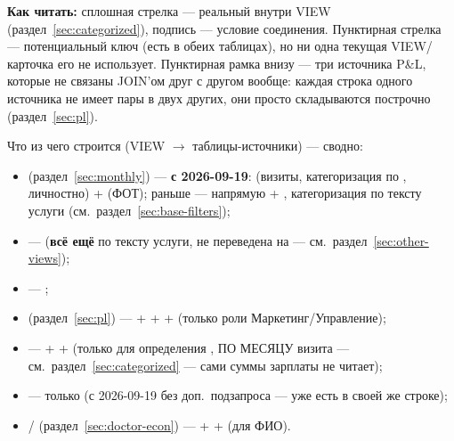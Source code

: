 \documentclass[11pt,a4paper]{article}
\begin{document}
\textbf{Как читать:} сплошная стрелка --- реальный \texttt{} внутри
VIEW (раздел~\ref{sec:categorized}), подпись --- условие соединения.
Пунктирная стрелка --- потенциальный ключ (есть в обеих таблицах), но
ни одна текущая VIEW/карточка его не использует. Пунктирная рамка внизу
--- три источника P\&L, которые не связаны JOIN'ом друг с другом вообще:
каждая строка одного источника не имеет пары в двух других, они просто
складываются построчно (раздел~\ref{sec:pl}).

Что из чего строится (VIEW $\to$ таблицы-источники) --- сводно:

\begin{itemize}[leftmargin=*]
\item \texttt{} (раздел~\ref{sec:monthly}) ---
  \textbf{с 2026-09-19}: \texttt{} (визиты, категоризация
  по \texttt{}, личностно) + \texttt{} (ФОТ); раньше ---
  \texttt{} напрямую + \texttt{}, категоризация
  по тексту услуги (см.\ раздел~\ref{sec:base-filters});
\item \texttt{} --- \texttt{}
  (\textbf{всё ещё} по тексту услуги, не переведена на
  \texttt{} --- см.\ раздел~\ref{sec:other-views});
\item \texttt{} --- \texttt{};
\item \texttt{} (раздел~\ref{sec:pl}) ---
  \texttt{} + \texttt{} + \texttt{} +
  \texttt{} (только роли Маркетинг/Управление);
\item \texttt{} --- \texttt{} +
  \texttt{} + \texttt{} (только для определения
  \texttt{}, ПО МЕСЯЦУ визита --- см.\ раздел~\ref{sec:categorized} ---
  сами суммы зарплаты не читает);
\item \texttt{} --- только \texttt{} (с
  2026-09-19 без доп.\ подзапроса --- \texttt{} уже есть в своей же
  строке);
\item \texttt{} / \texttt{}
  (раздел~\ref{sec:doctor-econ}) --- \texttt{} +
  \texttt{} + \texttt{} (для ФИО).
\end{itemize}
\end{document}
